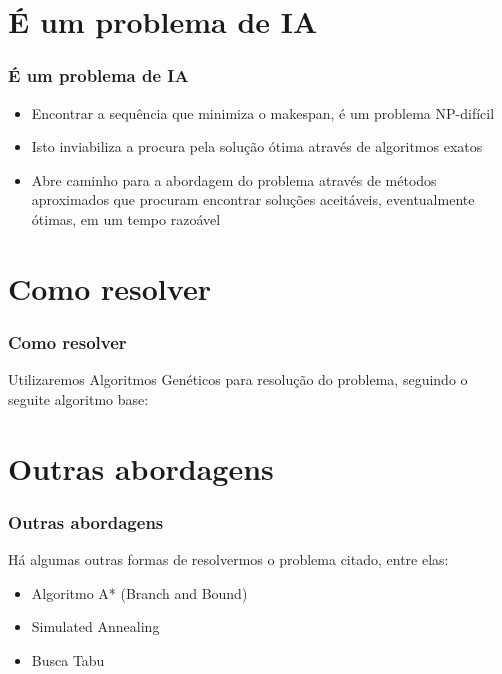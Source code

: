 \documentclass[12pt]{beamer}
\begin{document}
\section{É um problema de IA}
\begin{frame}
        \frametitle{É um problema de IA}
        \begin{block}{}
                \begin{itemize}
                        \item Encontrar a sequência que minimiza o makespan, é um problema NP-difícil   \pause
                        \item Isto inviabiliza a procura pela solução ótima através de algoritmos exatos   \pause
                        \item Abre caminho para a abordagem do problema através de métodos aproximados que procuram encontrar soluções aceitáveis, eventualmente ótimas, em um tempo razoável  \pause
                \end{itemize}
        \end{block}
\end{frame}

\section{Como resolver} 
\begin{frame} 
        \frametitle{Como resolver}
        \begin{block}{Utilizaremos Algoritmos Genéticos para resolução do problema, seguindo o seguite algoritmo base:}
	\end{block}
\end{frame}

\section{Outras abordagens} 
\begin{frame} 
        \frametitle{Outras abordagens}
        \begin{block}{Há algumas outras formas de resolvermos o problema citado, entre elas:}
                \begin{itemize}
                        \item Algoritmo A* (Branch and Bound)    \pause
                        \item Simulated Annealing   \pause
                        \item Busca Tabu  \pause
                \end{itemize}
        \end{block}
\end{frame}
              
\end{document}
